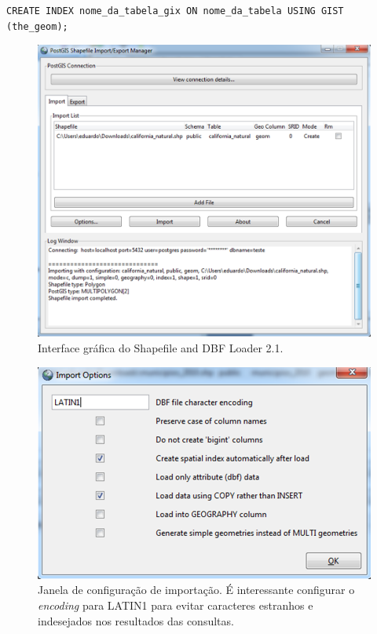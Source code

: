 	\begin{lstlisting}[float,floatplacement=H]
		CREATE INDEX nome_da_tabela_gix ON nome_da_tabela USING GIST (the_geom);
	\end{lstlisting}

	\begin{figure}
		\centering
		\includegraphics[width=1\linewidth]{data/shapefile_loader_gui}
		\caption{Interface gráfica do Shapefile and DBF Loader 2.1.}
		\label{fig:shapefileloadergui}
	\end{figure}
	
	\begin{figure}
		\centering
		\includegraphics[width=1\linewidth]{data/import_config}
		\caption{Janela de configuração de importação. É interessante configurar o \textit{encoding} para LATIN1 para evitar caracteres estranhos e indesejados nos resultados das consultas.}
		\label{fig:importconfig}
	\end{figure}

